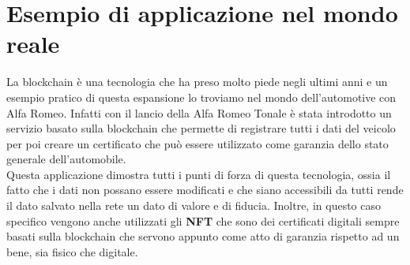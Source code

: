 \section{Esempio di applicazione nel mondo reale}
La blockchain è una tecnologia che ha preso molto piede negli ultimi anni e 
un esempio pratico di questa espansione lo troviamo nel mondo dell'automotive
con Alfa Romeo. Infatti con il lancio della Alfa Romeo Tonale è stata introdotto
un servizio basato sulla blockchain che permette di registrare tutti i dati del
veicolo per poi creare un certificato che può essere utilizzato come garanzia 
dello stato generale dell'automobile. \\
Questa applicazione dimostra tutti i punti di forza di questa tecnologia, ossia
il fatto che i dati non possano essere modificati e che siano accessibili da
tutti rende il dato salvato nella rete un dato di valore e di fiducia. Inoltre, 
in questo caso specifico vengono anche utilizzati gli \textbf{NFT} che sono
dei certificati digitali sempre basati sulla blockchain che servono appunto
come atto di garanzia rispetto ad un bene, sia fisico che digitale.

